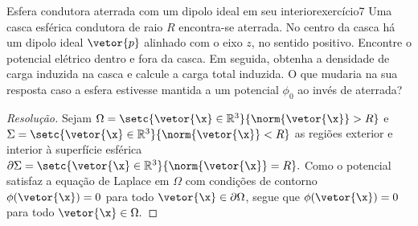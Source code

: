 \begin{exercício}{Esfera condutora aterrada com um dipolo ideal em seu interior}{exercício7}
    Uma casca esférica condutora de raio \(R\) encontra-se aterrada. No centro da casca há um dipolo ideal \(\vetor{p}\) alinhado com o eixo \(z\), no sentido positivo. Encontre o potencial elétrico dentro e fora da casca. Em seguida, obtenha a densidade de carga induzida na casca e calcule a carga total induzida. O que mudaria na sua resposta caso a esfera estivesse mantida a um potencial \(\phi_0\) ao invés de aterrada?
\end{exercício}
\begin{proof}[Resolução]
    Sejam \(\Omega = \setc{\vetor{\x} \in \mathbb{R}^3}{\norm{\vetor{\x}} > R}\) e \(\Sigma = \setc{\vetor{\x} \in \mathbb{R}^3}{\norm{\vetor{\x}} < R}\) as regiões exterior e interior à superfície esférica \(\partial \Sigma = \setc{\vetor{\x} \in \mathbb{R}^3}{\norm{\vetor{\x}} = R}.\) Como o potencial satisfaz a equação de Laplace em \(\Omega\) com condições de contorno \(\phi(\vetor{\x}) = 0\) para todo \(\vetor{\x} \in \partial \Omega\), segue que \(\phi(\vetor{\x}) = 0\) para todo \(\vetor{\x} \in \Omega.\)


\end{proof}
